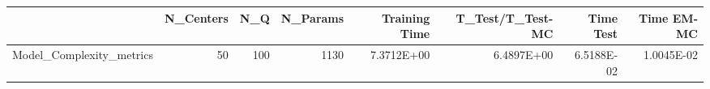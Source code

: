 \begin{tabular}{lrrrrrrr}
\toprule
{} &  N\_Centers &  N\_Q &  N\_Params &  Training Time &  T\_Test/T\_Test-MC &  Time Test &  Time EM-MC \\
\midrule
Model\_Complexity\_metrics &         50 &  100 &      1130 &     7.3712E+00 &        6.4897E+00 & 6.5188E-02 &  1.0045E-02 \\
\bottomrule
\end{tabular}
